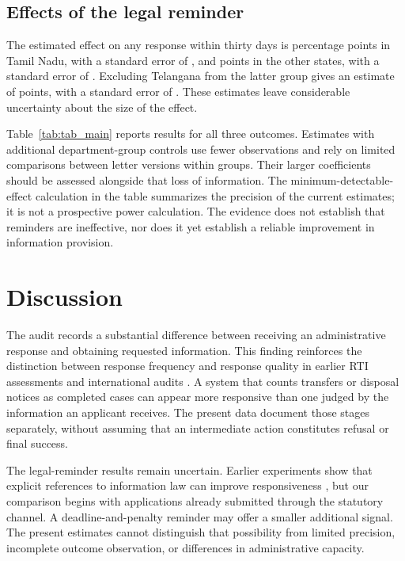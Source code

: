 \documentclass[11pt]{article}
\begin{document}
\subsection{Effects of the legal reminder}
The estimated effect on any response within thirty days is \rtibtn{} percentage points in Tamil Nadu, with a standard error of \rtisetn{}, and \rtibother{} points in the other states, with a standard error of \rtiseother{}. Excluding Telangana from the latter group gives an estimate of \rtibextg{} points, with a standard error of \rtiseextg{}. These estimates leave considerable uncertainty about the size of the effect.

Table~\ref{tab:tab_main} reports results for all three outcomes. Estimates with additional department-group controls use fewer observations and rely on limited comparisons between letter versions within groups. Their larger coefficients should be assessed alongside that loss of information. The minimum-detectable-effect calculation in the table summarizes the precision of the current estimates; it is not a prospective power calculation. The evidence does not establish that reminders are ineffective, nor does it yet establish a reliable improvement in information provision.

\FloatBarrier

\section{Discussion}
The audit records a substantial difference between receiving an administrative response and obtaining requested information. This finding reinforces the distinction between response frequency and response quality in earlier RTI assessments and international audits \citep{raag2014,lagunes2019}. A system that counts transfers or disposal notices as completed cases can appear more responsive than one judged by the information an applicant receives. The present data document those stages separately, without assuming that an intermediate action constitutes refusal or final success.

The legal-reminder results remain uncertain. Earlier experiments show that explicit references to information law can improve responsiveness \citep{worthy2017,grimmelikhuijsen2019,spac2018}, but our comparison begins with applications already submitted through the statutory channel. A deadline-and-penalty reminder may offer a smaller additional signal. The present estimates cannot distinguish that possibility from limited precision, incomplete outcome observation, or differences in administrative capacity.
\end{document}
